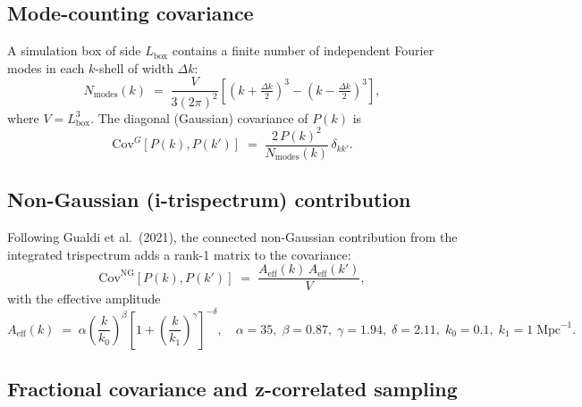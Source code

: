 \documentclass[12pt,a4paper]{article}
\newcommand{\Lbox}{L_\mathrm{box}}
\newcommand{\Nmodes}{N_\mathrm{modes}}
\begin{document}
\subsection{Mode-counting covariance}

A simulation box of side $\Lbox$ contains a finite number of independent
Fourier modes in each $k$-shell of width $\Delta k$:
\begin{equation}
  \Nmodes(k) \;=\; \frac{V}{3(2\pi)^2}
  \left[\left(k+\tfrac{\Delta k}{2}\right)^3
        - \left(k-\tfrac{\Delta k}{2}\right)^3\right],
\end{equation}
where $V = \Lbox^3$.
The diagonal (Gaussian) covariance of $P(k)$ is
\begin{equation}
  \mathrm{Cov}^G[P(k),P(k')] \;=\; \frac{2\,P(k)^2}{\Nmodes(k)}\,\delta_{kk'}.
  \label{eq:CovG}
\end{equation}

\subsection{Non-Gaussian (i-trispectrum) contribution}

Following Gualdi et al.~(2021), the connected non-Gaussian contribution
from the integrated trispectrum adds a rank-1 matrix to the covariance:
\begin{equation}
  \mathrm{Cov}^\mathrm{NG}[P(k),P(k')] \;=\;
  \frac{A_\mathrm{eff}(k)\,A_\mathrm{eff}(k')}{V},
  \label{eq:CovNG}
\end{equation}
with the effective amplitude
\begin{equation}
  A_\mathrm{eff}(k) \;=\; \alpha
  \left(\frac{k}{k_0}\right)^\beta
  \left[1+\left(\frac{k}{k_1}\right)^\gamma\right]^{-\delta},
  \quad
  \alpha=35,\;\beta=0.87,\;\gamma=1.94,\;\delta=2.11,\;k_0=0.1,\;k_1=1\;\mathrm{Mpc}^{-1}.
  \label{eq:Aeff}
\end{equation}

\subsection{Fractional covariance and z-correlated sampling}
\end{document}
